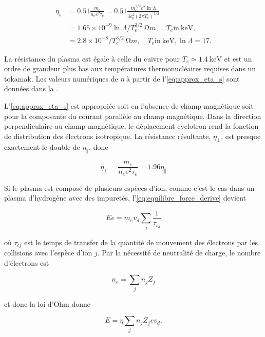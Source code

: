 \documentclass[main.tex]{subfiles}
\begin{document}
\begin{align}
\eta_s &= 0.51 \frac{m_e}{n_e e^2 \tau_e} = 0.51 \frac{m_e^{1/2} e^2 \ln \Lambda}{3 \varepsilon_0^2 \left( 2 \pi T_e \right)^{3/2}} \nonumber \\
&= 1.65 \times 10^{-9} \ln \Lambda / T_e^{3/2} \SI{}{\ohm m}, \quad T_e \text{in} \SI{}{\kilo\electronvolt}, \nonumber \\
&= 2.8 \times 10^{-8} / T_e^{3/2} \SI{}{\ohm m}, \quad T_e \text{in} \SI{}{\kilo\electronvolt}, \ln \Lambda = 17.
\label{eq:approx_eta_s}
\end{align}

\noindent La résistance du plasma est égale à celle du cuivre pour \( T_e \simeq \SI{1.4}{\kilo\electronvolt} \) et est un ordre de grandeur plus bas aux températures thermonucléaires requises dans un tokamak.
Les valeurs numériques de \( \eta \) à partir de l'\autoref{eq:approx_eta_s} sont données dans la \color{red}{Section 14.10 (lien à rajouter quand elle sera faite)}\color{black}.

L'\autoref{eq:approx_eta_s} est appropriée soit en l'absence de champ magnétique soit pour la composante du courant parallèle au champ magnétique.
Dans la direction perpendiculaire au champ magnétique, le déplacement cyclotron rend la fonction de distribution des électrons isotropique.
La résistance résultante, \( \eta_\perp \), est presque exactement le double de \( \eta_\parallel \), donc

\[
	\eta_\perp = \frac{m_e}{n_e e^2 \tau_e} = 1.96 \eta_\parallel
\]

\noindent Si le plasma est composé de plusieurs espèces d'ion, comme c'est le cas dans un plasma d'hydrogène avec des impuretés, l'\autoref{eq:equilibre_force_derive} devient

\begin{equation}
	E e = m_e v_d \sum_j \frac{1}{\tau_{cj}}
	\label{eq:equilibre_force_derive_2}
\end{equation}

\noindent où \( \tau_{cj} \) est le temps de transfer de la quantité de mouvement des électrons par les collisions avec l'espèce d'ion \( j \).
Par la nécessité de neutralité de charge, le nombre d'électrons est

\[
	n_e = \sum_j n_j Z_j
\]

\noindent et donc la loi d'Ohm donne

\begin{equation}
	E = \eta \sum_j n_j Z_j e v_d.
	\label{eq:loi_ohm_eta}
\end{equation}
\end{document}
